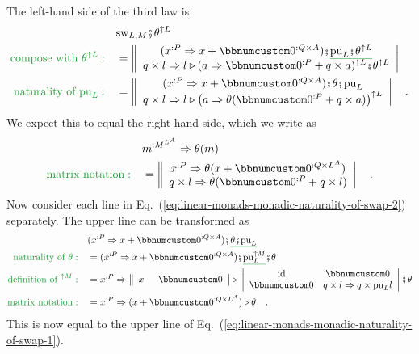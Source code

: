 The left-hand side of the third law is
\begin{align}
 & \text{sw}_{L,M}\bef\theta^{\uparrow L}\nonumber \\
{\color{greenunder}\text{compose with }\theta^{\uparrow L}:}\quad & =\left\Vert \begin{array}{c}
(x^{:P}\Rightarrow x+\bbnum 0^{:Q\times A})\bef\gunderline{\text{pu}_{L}\bef\theta^{\uparrow L}}\\
q\times l\Rightarrow l\triangleright(a\Rightarrow\bbnum 0^{:P}+q\times a)^{\uparrow L}\bef\theta^{\uparrow L}
\end{array}\right|\nonumber \\
{\color{greenunder}\text{naturality of }\text{pu}_{L}:}\quad & =\left\Vert \begin{array}{c}
(x^{:P}\Rightarrow x+\bbnum 0^{:Q\times A})\bef\theta\bef\text{pu}_{L}\\
q\times l\Rightarrow l\triangleright\big(a\Rightarrow\theta(\bbnum 0^{:P}+q\times a)\big)^{\uparrow L}
\end{array}\right|\quad.\label{eq:linear-monads-monadic-naturality-of-swap-2}
\end{align}
We expect this to equal the right-hand side, which we write as
\begin{align}
 & m^{:M^{L^{A}}}\Rightarrow\theta(m)\nonumber \\
{\color{greenunder}\text{matrix notation}:}\quad & =\left\Vert \begin{array}{c}
x^{:P}\Rightarrow\theta(x+\bbnum 0^{:Q\times L^{A}})\\
q\times l\Rightarrow\theta(\bbnum 0^{:P}+q\times l)
\end{array}\right|\quad.\label{eq:linear-monads-monadic-naturality-of-swap-1}
\end{align}
Now consider each line in Eq.~(\ref{eq:linear-monads-monadic-naturality-of-swap-2})
separately. The upper line can be transformed as
\begin{align*}
 & (x^{:P}\Rightarrow x+\bbnum 0^{:Q\times A})\bef\gunderline{\theta\bef\text{pu}_{L}}\\
{\color{greenunder}\text{naturality of }\theta:}\quad & =(x^{:P}\Rightarrow x+\bbnum 0^{:Q\times A})\bef\gunderline{\text{pu}_{L}^{\uparrow M}}\bef\theta\\
{\color{greenunder}\text{definition of }^{\uparrow M}:}\quad & =x^{:P}\Rightarrow\left\Vert \begin{array}{cc}
x\enskip & \bbnum 0\end{array}\right|\triangleright\left\Vert \begin{array}{cc}
\text{id} & \bbnum 0\\
\bbnum 0 & q\times l\Rightarrow q\times\text{pu}_{L}l
\end{array}\right|\bef\theta\\
{\color{greenunder}\text{matrix notation}:}\quad & =x^{:P}\Rightarrow(x+\bbnum 0^{:Q\times L^{A}})\triangleright\theta\quad.
\end{align*}
This is now equal to the upper line of Eq.~(\ref{eq:linear-monads-monadic-naturality-of-swap-1}).


